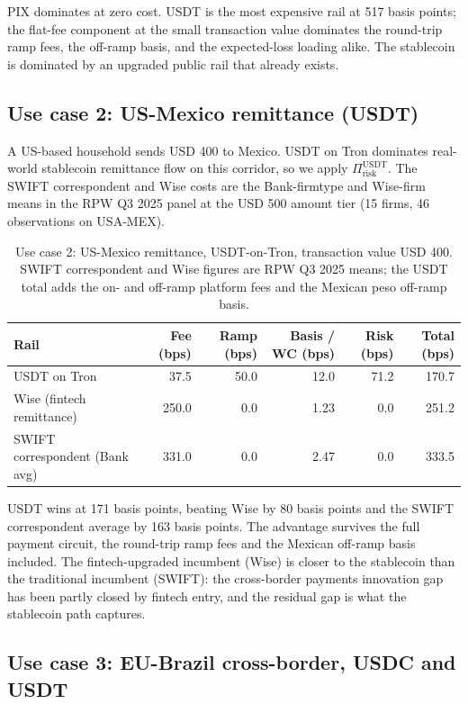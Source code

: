 PIX dominates at zero cost. USDT is the most expensive rail at 517 basis points; the flat-fee component at the small transaction value dominates the round-trip ramp fees, the off-ramp basis, and the expected-loss loading alike. The stablecoin is dominated by an upgraded public rail that already exists.

\subsection{Use case 2: US-Mexico remittance (USDT)}\label{sub:us_mx}

A US-based household sends USD 400 to Mexico. USDT on Tron dominates real-world stablecoin remittance flow on this corridor, so we apply $\Pi_{\text{risk}}^{\text{USDT}}$. The SWIFT correspondent and Wise costs are the Bank-firmtype and Wise-firm means in the RPW Q3 2025 panel at the USD 500 amount tier (15 firms, 46 observations on USA-MEX).

\begin{table}[H]
\centering
\caption{Use case 2: US-Mexico remittance, USDT-on-Tron, transaction value USD 400. SWIFT correspondent and Wise figures are RPW Q3 2025 means; the USDT total adds the on- and off-ramp platform fees and the Mexican peso off-ramp basis.}\label{tab:uc2}
\begin{tabular}{lrrrrr}
\toprule
Rail & Fee (bps) & Ramp (bps) & Basis / WC (bps) & Risk (bps) & Total (bps) \\
\midrule
USDT on Tron                     & 37.5  & 50.0 & 12.0 & 71.2 & 170.7 \\
Wise (fintech remittance)        & 250.0 & 0.0  & 1.23 & 0.0  & 251.2 \\
SWIFT correspondent (Bank avg)   & 331.0 & 0.0  & 2.47 & 0.0  & 333.5 \\
\bottomrule
\end{tabular}
\end{table}

USDT wins at 171 basis points, beating Wise by 80 basis points and the SWIFT correspondent average by 163 basis points. The advantage survives the full payment circuit, the round-trip ramp fees and the Mexican off-ramp basis included. The fintech-upgraded incumbent (Wise) is closer to the stablecoin than the traditional incumbent (SWIFT): the cross-border payments innovation gap has been partly closed by fintech entry, and the residual gap is what the stablecoin path captures.

\subsection{Use case 3: EU-Brazil cross-border, USDC and USDT}\label{sub:eu_br}

